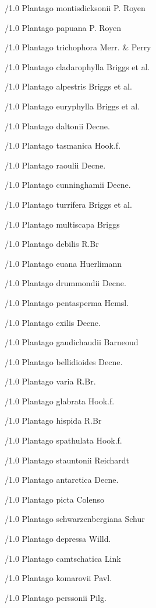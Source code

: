 \documentclass[12pt]{article}
\begin{document}
\begin{classif}{1.0}
	/1.0 {Plantago montisdicksonii} P. Royen

	/1.0 {Plantago papuana} P. Royen

	/1.0 {Plantago trichophora} Merr. \& Perry

	/1.0 {Plantago cladarophylla} Briggs et al.

	/1.0 {Plantago alpestris} Briggs et al.

	/1.0 {Plantago euryphylla} Briggs et al.

	/1.0 {Plantago daltonii} Decne.

	/1.0 {Plantago tasmanica} Hook.f.

	/1.0 {Plantago raoulii} Decne.

	\medskip

	/1.0 {Plantago cunninghamii} Decne.

	/1.0 {Plantago turrifera} Briggs et al.

	/1.0 {Plantago multiscapa} Briggs

	/1.0 {Plantago debilis} R.Br

	/1.0 {Plantago euana} Huerlimann

	\medskip

	/1.0 {Plantago drummondii} Decne.

	/1.0 {Plantago pentasperma} Hemsl.

	\medskip

	/1.0 {Plantago exilis} Decne.

	/1.0 {Plantago gaudichaudii} Barneoud

	/1.0 {Plantago bellidioides} Decne.

	/1.0 {Plantago varia} R.Br.

	/1.0 {Plantago glabrata} Hook.f.

	/1.0 {Plantago hispida} R.Br

	/1.0 {Plantago spathulata} Hook.f.

	/1.0 {Plantago stauntonii} Reichardt

	\medskip

	/1.0 {Plantago antarctica} Decne.

	/1.0 {Plantago picta} Colenso

	/1.0 {Plantago schwarzenbergiana} Schur

	/1.0 {Plantago depressa} Willd.

	/1.0 {Plantago camtschatica} Link

	\medskip

	/1.0 {Plantago komarovii} Pavl.

	/1.0 {Plantago perssonii} Pilg.


\end{classif}
\end{document}
